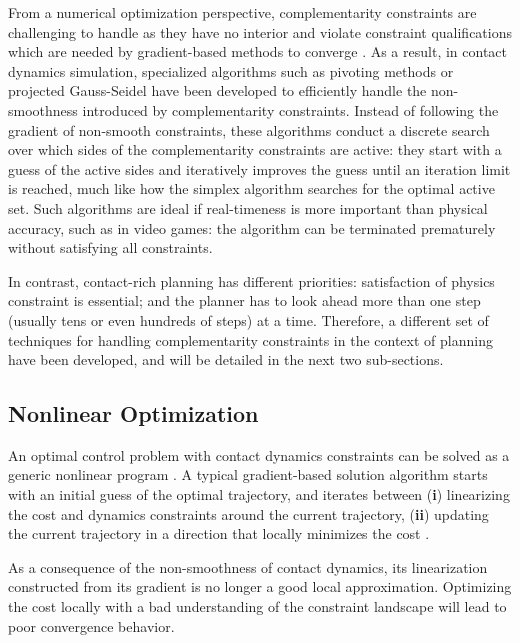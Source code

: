 From a numerical optimization perspective, complementarity constraints are challenging to handle as they have no interior and violate constraint qualifications which are needed by gradient-based methods to converge \cite[]{biegler2010nonlinear}. As a result, in contact dynamics simulation, specialized algorithms such as pivoting methods or projected Gauss-Seidel \cite{SiggraphContact22} have been developed to efficiently handle the non-smoothness introduced by complementarity constraints. Instead of following the gradient of non-smooth constraints, these algorithms conduct a discrete search over which sides of the complementarity constraints are active: they start with a guess of the active sides and iteratively improves the guess until an iteration limit is reached, much like how the simplex algorithm searches for the optimal active set. Such algorithms are ideal if real-timeness is more important than physical accuracy, such as in video games: the algorithm can be terminated prematurely without satisfying all constraints. 

In contrast, contact-rich planning has different priorities: satisfaction of physics constraint is essential; and the planner has to look ahead more than one step (usually tens or even hundreds of steps) at a time. Therefore, a different set of techniques for handling complementarity constraints in the context of planning have been developed, and will be detailed in the next two sub-sections.

\subsection{Nonlinear Optimization}
\label{sec:intro:nonlinear_optimization}
An optimal control problem with contact dynamics constraints can be solved as a generic nonlinear program \cite{bertsekas1997nonlinear}. A typical gradient-based solution algorithm starts with an initial guess of the optimal trajectory, and iterates between (\textbf{i}) linearizing the cost and dynamics constraints around the current trajectory, (\textbf{ii}) updating the current trajectory in a direction that locally minimizes the cost \cite{gill2005snopt, todorov2005generalized}. 

As a consequence of the non-smoothness of contact dynamics, its linearization constructed from its gradient is no longer a good local approximation. Optimizing the cost locally with a bad understanding of the constraint landscape will lead to poor convergence behavior. 

